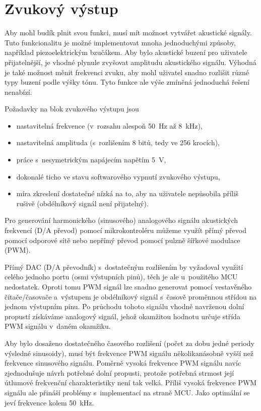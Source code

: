 \section{Zvukový výstup}
Aby mohl budík plnit svou funkci, musí mít možnost vytvářet akustické signály.
Tuto funkcionalitu je možné implementovat mnoha jednoduchými způsoby, například
piezoelektrickým bzučákem. Aby bylo akustické buzení pro uživatele
přijatelnější, je vhodné plynule zvyšovat amplitudu akustického signálu.
Výhodná je také možnost měnit frekvenci zvuku, aby mohl uživatel snadno
rozlišit různé typy buzení podle výšky tónu. Tyto funkce ale výše zmíněná
jednoduchá řešení nenabízí.

Požadavky na blok zvukového výstupu jsou
\begin{itemize}[nosep]
    \item nastavitelná frekvence (v~rozsahu alespoň \SI{50}{\hertz} až
        \SI{8}{\kilo\hertz}),
    \item nastavitelná amplituda (s~rozlišením 8 bitů, tedy ve 256 krocích),
    \item práce s~nesymetrickým napájecím napětím \SI{5}{\volt},
    \item dokonalé ticho ve stavu softwarového vypnutí zvukového výstupu,
    \item míra zkreslení dostatečné nízká na to, aby na uživatele nepůsobila
        příliš rušivě (obdélníkový signál není přijatelný).
\end{itemize}

Pro generování harmonického (sinusového) analogového signálu akustických
frekvencí (D/A převod) pomocí mikrokontroléru můžeme využít přímý převod pomocí
odporové sítě nebo nepřímý převod pomocí pulzně šířkové modulace (\acs{PWM}).

Přímý DAC (D/A převodník) s~dostatečným rozlišením by vyžadoval využití celého
jednoho portu (osmi výstupních pinů), těch je ale u~použitého \acs{MCU}
nedostatek. Oproti tomu PWM signál lze snadno generovat pomocí vestavěného
čítače/časovače a~výstupem je obdélníkový signál s~časově proměnnou střídou na
jednom výstupním pinu. Po průchodu tohoto signálu vhodně navrženou dolní
propustí získáváme analogový signál, jehož okamžitou hodnotu určuje střída PWM
signálu v~daném okamžiku.

Aby bylo dosaženo dostatečného časového rozlišení (počet  za dobu
jedné periody výsledné sinusoidy), musí být frekvence PWM signálu
několikanásobně vyšší než frekvence sinusového signálu. Poměrně vysoká
frekvence PWM signálu navíc zjednodušuje návrh potřebné dolní propusti, protože
potřebná strmost její útlumové frekvenční charakteristiky není tak velká.
Příliš vysoká frekvence PWM signálu ale přináší problémy s~implementací na
straně MCU. Jako optimální se jeví frekvence kolem \SI{50}{\kilo\hertz}.

